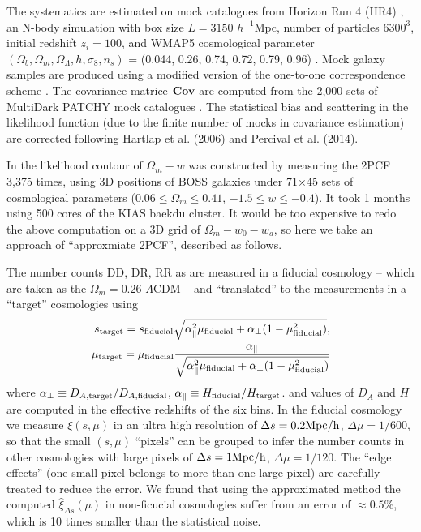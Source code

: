 \documentclass[useAMS,usenatbib]{mnras}
\begin{document}
The systematics are estimated on mock catalogues from Horizon Run 4 (HR4) \cite{HR4},
an N-body simulation with box size $L={3150}$ $h^{-1}$Mpc, number of particles $6300^3$,   
initial redshift $z_{i}=100$, and WMAP5 cosmological parameter 
$(\Omega_{b},\Omega_{m},\Omega_\Lambda,h,\sigma_8,n_s)$  = (0.044, 0.26, 0.74, 0.72, 0.79, 0.96) \citep[]{komatsu 2011}.
Mock galaxy samples are produced using a modified version of the one-to-one correspondence scheme \citep{hong2016}. 
The covariance matrice ${\bf Cov}$ are computed from the 2,000 sets of MultiDark PATCHY mock catalogues \citep{MDPATCHY}.
The statistical bias and scattering in the likelihood function (due to the finite number of mocks in covariance estimation) 
are corrected following Hartlap et al. (2006) and Percival et al. (2014).

In \cite{Li2016} the likelihood contour of $\Omega_m-w$ was constructed by
measuring the 2PCF 3,375 times,
using 3D positions of BOSS galaxies under 71$\times$45 sets of cosmological parameters
($0.06\leq \Omega_m\leq 0.41$, $-1.5 \leq w \leq -0.4$).
It took 1 months using 500 cores of the KIAS baekdu cluster.
It would be too expensive to redo the above computation on a 3D grid of $\Omega_m-w_0-w_a$,
so here we take an approach  of ``approxmiate 2PCF'', described as follows.

The number counts DD, DR, RR as are measured in a fiducial cosmology
-- which are taken as the $\Omega_m=0.26$ $\Lambda$CDM --
and ``translated'' to the measurements in a ``target'' cosmologies using 
\begin{eqnarray}
 s_{\rm target} = s_{\rm fiducial} \sqrt{\alpha_{\parallel}^2 \mu_{\rm fiducial}+\alpha_{\bot}(1-\mu_{\rm fiducial}^2)}, \\
 \mu_{\rm target} = \mu_{\rm fiducial} \frac{\alpha_\parallel}
 {\sqrt{\alpha_{\parallel}^2 \mu_{\rm fiducial} +\alpha_{\bot}(1-\mu_{\rm fiducial}^2)}}
\end{eqnarray}
where $\alpha_{\bot}\equiv D_{A,\rm target}/D_{A,\rm fiducial}$,
$\alpha_{\parallel}\equiv H_{\rm fiducial}/H_{\rm target}$.
and values of $D_A$ and $H$ are computed in the effective redshifts of the six bins.
In the fiducial cosmology
we measure $\xi(s,\mu)$ in an ultra high resolution of
$\Delta s = 0.2 {\rm Mpc/h}$, $\Delta \mu = 1/600$,
so that the small $(s,\mu)$ ``pixels'' can be grouped to infer 
the number counts in other cosmologies with large pixels of 
$\Delta s = 1 {\rm Mpc/h}$, $\Delta \mu = 1/120$.
The ``edge effects'' (one small pixel belongs to more than one large pixel) 
are carefully treated to reduce the error.
We found that using the approximated method the computed 
$\hat\xi_{\Delta s}(\mu)$ in non-ficucial cosmologies suffer from
an error of $\approx0.5\%$, which is 10 times smaller than 
the statistical noise.
\end{document}
